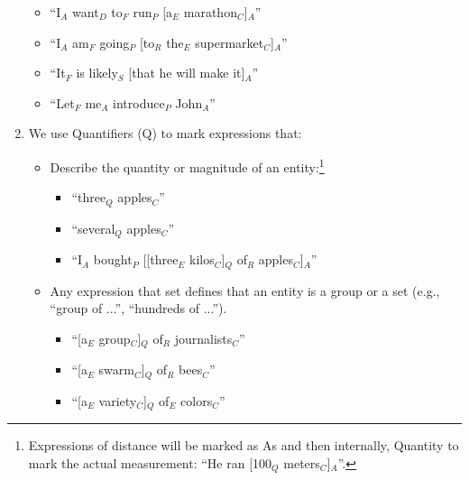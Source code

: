 \documentclass[11pt]{article}
\newcommand{\dd}[1]{{\color{blue}{#1}}}
\newcommand{\oa}[1]{{\color{blue}{OA: #1}}}
\newcommand{\nss}[1]{}
\begin{document}
\begin{enumerate}
  \begin{itemize}
  \item
    ``I$_A$ want$_D$ to$_F$ run$_P$ [a$_E$ marathon$_C$]$_A$''
  \item
    ``I$_A$ am$_F$ going$_P$ [to$_R$ the$_E$ supermarket$_C$]$_A$''
  \item
    ``It$_F$ is likely$_S$ [that he will make it]$_A$''
  \item
    ``Let$_F$ me$_A$ introduce$_P$ John$_A$''
  \end{itemize}
  
  
  
 \item We use {\sc Quantifiers (Q)} to mark expressions that:
 
\begin{itemize}
\item Describe the quantity or magnitude of an entity:\footnote{Expressions of distance will be marked as As and then internally, Quantity to mark the actual measurement: ``He ran [100$_Q$ meters$_C$]$_A$''.}

\begin{itemize}
\item
``three$_Q$ apples$_C$''
\item
``several$_Q$ apples$_C$''
\item
``I$_A$ bought$_P$ [[three$_E$ kilos$_C$]$_Q$ of$_R$ apples$_C$]$_A$''
\end{itemize}
 
\item Any expression that set defines that an entity is a group or a set (e.g., ``group of ...'', ``hundreds of ...'').

\begin{itemize}
\item  
``[a$_E$ group$_C$]$_Q$ of$_R$ journalists$_C$''
\item 
``[a$_E$ swarm$_C$]$_Q$ of$_R$ bees$_C$''
\item  
``[a$_E$ variety$_C$]$_Q$ of$_E$ colors$_C$''
   \end{itemize}


\end{itemize}
\end{enumerate}
\end{document}
